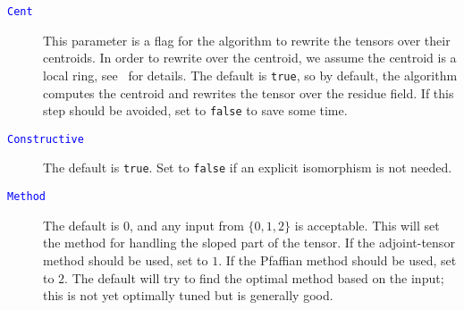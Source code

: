 \documentclass{documentation}
\begin{document}
\begin{description}
\item[\textcolor{blue}{\tt Cent}]
This parameter is a flag for the algorithm to rewrite the tensors over their centroids. In order to rewrite over the centroid, we assume the centroid is a local ring, see~\cite{TensorSpacePackage} for details. The default is \texttt{true}, so by default, the algorithm computes the centroid and rewrites the tensor over the residue field.
If this step should be avoided, set to \texttt{false} to save some time.
\item[\textcolor{blue}{\tt Constructive}]
The default is \texttt{true}. 
Set to \texttt{false} if an explicit isomorphism is not needed.
\item[\textcolor{blue}{\tt Method}]
The default is $0$, and any input from $\{ 0,1,2\}$ is acceptable. 
This will set the method for handling the sloped part of the tensor.
If the adjoint-tensor method should be used, set to $1$. If the Pfaffian method should be used, set to $2$. The default will try to find the optimal method based on the input; this is not yet optimally tuned but is generally good.
\end{description}
\end{document}
